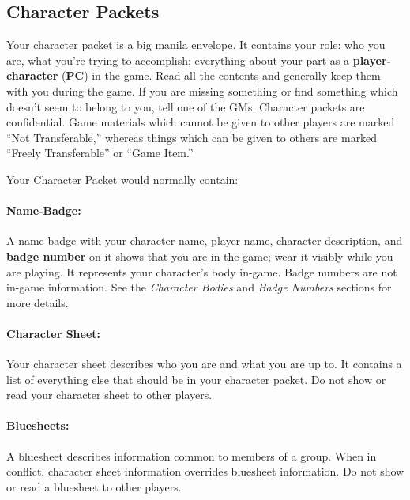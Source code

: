 \documentclass[sheet]{GL2020}
\begin{document}
\subsection{Character Packets}

Your character packet is a big manila envelope.  It contains your role: who you are, what you're trying to accomplish; everything about your part as a {\bf player-character} ({\bf PC}) in the game.  Read all the contents and generally keep them with you during the game.  If you are missing something or find something which doesn't seem to belong to you, tell one of the GMs.  Character packets are confidential.  Game materials which cannot be given to other players are marked ``Not Transferable,'' whereas things which can be given to others are marked ``Freely Transferable'' or ``Game Item.''

Your Character Packet would normally contain:

\paragraph{Name-Badge:} A name-badge with your character name, player name, character description, and {\bf badge number} on it shows that you are in the game; wear it visibly while you are playing.  It represents your character's body in-game.  Badge numbers are not in-game information. See the \emph{Character Bodies} and \emph{Badge Numbers} sections for more details.

\paragraph{Character Sheet:} Your character sheet describes who you are and what you are up to.  It contains a list of everything else that should be in your character packet.  Do not show or read your character sheet to other players.

\paragraph{Bluesheets:} A bluesheet describes information common to members of a group.  When in conflict, character sheet information overrides bluesheet information.  Do not show or read a bluesheet to other players.
\end{document}
